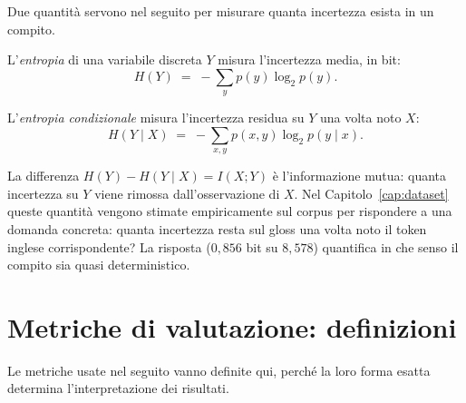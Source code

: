Due quantità servono nel seguito per misurare quanta incertezza esista in un
compito.

L'\emph{entropia} di una variabile discreta $Y$ misura l'incertezza media, in
bit:
\begin{equation}
  \label{eq:entropy}
  H(Y) \;=\; -\sum_{y} p(y) \log_2 p(y).
\end{equation}

L'\emph{entropia condizionale} misura l'incertezza residua su $Y$ una volta noto
$X$:
\begin{equation}
  \label{eq:cond-entropy}
  H(Y \mid X) \;=\; -\sum_{x,y} p(x,y) \log_2 p(y \mid x).
\end{equation}

La differenza $H(Y) - H(Y \mid X) = I(X;Y)$ è l'informazione mutua: quanta
incertezza su $Y$ viene rimossa dall'osservazione di $X$. Nel
Capitolo~\ref{cap:dataset} queste quantità vengono stimate empiricamente sul
corpus per rispondere a una domanda concreta: quanta incertezza resta sul gloss
una volta noto il token inglese corrispondente? La risposta ($0{,}856$ bit su
$8{,}578$) quantifica in che senso il compito sia quasi deterministico.

\section{Metriche di valutazione: definizioni}

Le metriche usate nel seguito vanno definite qui, perché la loro forma esatta
determina l'interpretazione dei risultati.

